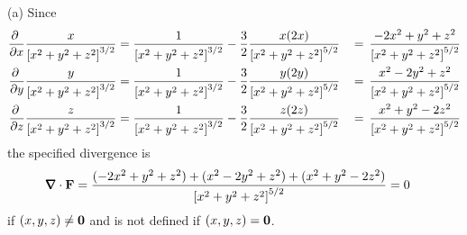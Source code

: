 \begin{solution} (a) Since
\begin{alignat*}{3}
\pdiff{}{x}\frac{x}{{[x^2+y^2+z^2]}^{3/2}}
&=\frac{1}{{[x^2+y^2+z^2]}^{3/2}} 
            -\frac{3}{2}\frac{x(2x)}{{[x^2+y^2+z^2]}^{5/2}}
&\,=\,\frac{-2x^2+y^2+z^2}{{[x^2+y^2+z^2]}^{5/2}}
\\
\pdiff{}{y}\frac{y}{{[x^2+y^2+z^2]}^{3/2}}
&=\frac{1}{{[x^2+y^2+z^2]}^{3/2}} 
            -\frac{3}{2}\frac{y(2y)}{{[x^2+y^2+z^2]}^{5/2}}
&\,=\,\frac{x^2-2y^2+z^2}{{[x^2+y^2+z^2]}^{5/2}}
\\
\pdiff{}{z}\frac{z}{{[x^2+y^2+z^2]}^{3/2}}
&=\frac{1}{{[x^2+y^2+z^2]}^{3/2}} 
            -\frac{3}{2}\frac{z(2z)}{{[x^2+y^2+z^2]}^{5/2}}
&\,=\,\frac{x^2+y^2-2z^2}{{[x^2+y^2+z^2]}^{5/2}}
\end{alignat*}
the specified divergence is
\begin{align*}
\vnabla\cdot\vF 
           &=  \frac{(-2x^2+y^2+z^2) + (x^2-2y^2+z^2) + (x^2+y^2-2z^2)}
                     {{[x^2+y^2+z^2]}^{5/2}}
           =0
\end{align*}
if $(x,y,z)\ne\mathbf{0}$ and is not defined if $(x,y,z)=\mathbf{0}$.


\end{solution}
